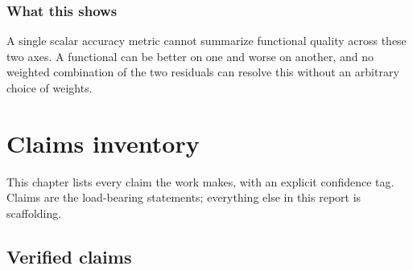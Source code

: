 \documentclass[11pt]{report}
\theoremstyle{definition}
\theoremstyle{remark}
\begin{document}
\subsection{What this shows}

A single scalar accuracy metric cannot summarize functional quality across
these two axes. A functional can be better on one and worse on another,
and no weighted combination of the two residuals can resolve this without
an arbitrary choice of weights.

\chapter{Claims inventory}
\label{ch:claims}

This chapter lists every claim the work makes, with an explicit
confidence tag. Claims are the load-bearing statements; everything else in
this report is scaffolding.

\section{Verified claims}
\end{document}
